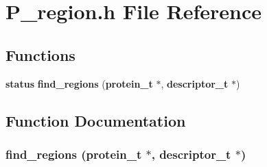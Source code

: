 \section{P\_\-region.h File Reference}
\label{P__region_8h}
\subsection*{Functions}
\begin{CompactItemize}
\item 
{\bf status} {\bf find\_\-regions} ({\bf protein\_\-t} $\ast$, {\bf descriptor\_\-t} $\ast$)
\end{CompactItemize}


\subsection{Function Documentation}
\subsubsection{ find\_\-regions ({\bf protein\_\-t} $\ast$, {\bf descriptor\_\-t} $\ast$)}\label{P__region_8h_a0}


